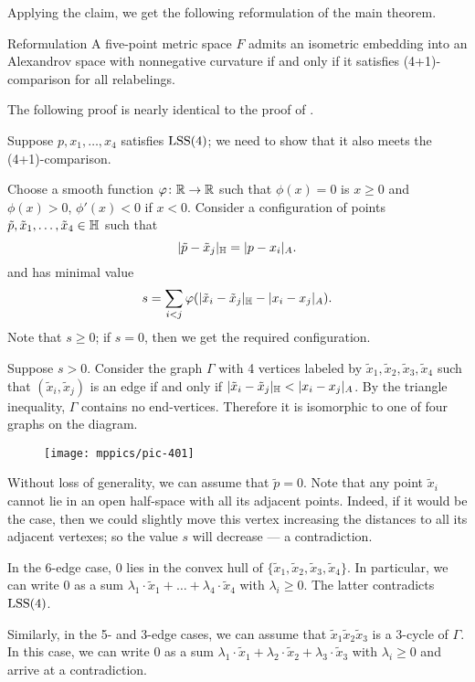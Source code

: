 \documentclass{article}
\begin{document}
Applying the claim, we get the following reformulation of the main theorem.

\begin{thm}{Reformulation}\label{thm:main-(4+1)}
A five-point metric space $F$ admits an isometric embedding into an Alexandrov space with nonnegative curvature
if and only if it satisfies (4+1)-comparison for all relabelings.
\end{thm}

The following proof is nearly identical to the proof of \cite[Proposition 4.1]{lebedeva-petrunin-zolotov}.

Suppose $p,x_1,\dots,x_4$ satisfies $\mathrm{LSS}(4)$;
we need to show that it also meets the (4+1)-comparison.

Choose a smooth function $\varphi\colon\mathbb{R}\to \mathbb{R}$ such that $\phi(x)=0$ is $x\ge0$ and $\phi(x)>0$, $\phi'(x)<0$ if $x<0$.
Consider a configuration of points $\tilde p,\tilde x_1,\dots,\tilde x_4\in \mathbb H$ such that 
\[
|\tilde p-\tilde x_j|_{\mathbb H}=|p-x_i|_{A}.
\]
and has minimal value
\[
s=\sum_{i<j}\varphi(|\tilde x_i-\tilde x_j|_{\mathbb H}- |x_i-x_j|_{A}).
\]
Note that $s\ge0$;
if $s=0$, then we get the required configuration.

Suppose $s>0$.
Consider the graph $\Gamma$ with 4 vertices labeled by $\tilde x_1,\tilde x_2,\tilde x_3,\tilde x_4$ such that 
$(\tilde x_i,\tilde x_j)$ is an edge if and only if $|\tilde x_i-\tilde x_j|_{\HH}<|x_i-x_j|_{A}$.
By the triangle inequality, $\Gamma$ contains no end-vertices.
Therefore it is isomorphic to one of four graphs on the diagram.

\begin{figure}[ht!]
\centering
\texttt{[image: mppics/pic-401]}
\end{figure}

Without loss of generality, we can assume that $\tilde p=0$.
Note that any point $\tilde x_i$ cannot lie in an open half-space with all its
adjacent points.
Indeed, if it would be the case, then we could slightly move this
vertex increasing the distances to all its adjacent vertexes;
so the value $s$ will decrease --- a contradiction.

In the 6-edge case, $0$ lies in the convex hull of $\{\tilde x_1,\tilde x_2,\tilde x_3,\tilde x_4\}$.
In particular, we can write $0$ as a sum $\lambda_1\cdot \tilde x_1+\dots+\lambda_4\cdot\tilde x_4$ with $\lambda_i\ge0$.
The latter contradicts $\mathrm{LSS}(4)$.

Similarly, in the 5- and 3-edge cases, we can assume that $\tilde x_1\tilde x_2\tilde x_3$ is a 3-cycle of $\Gamma$.
In this case, we can write $0$ as a sum $\lambda_1\cdot \tilde x_1+\lambda_2\cdot\tilde x_2+\lambda_3\cdot\tilde x_3$ with $\lambda_i\ge0$ and arrive at a contradiction.
\end{document}
